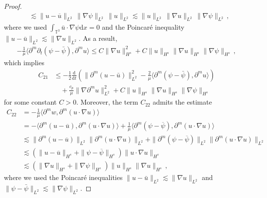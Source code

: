 \documentclass[reqno,11pt]{amsart}
\numberwithin{equation}{section}
\def\p{\partial}
\def\d{\mathrm{d}}
\begin{document}
\begin{proof}
\begin{equation*}
\begin{aligned}
& \lesssim \| u - \overline{u} \|_{L^2} \, \| \nabla \psi \|_{L^2} \, \| u \|_{L^2} \lesssim \| u \|_{L^2} \, \| \nabla u \|_{L^2} \, \| \nabla \psi \|_{L^2} \,,
\end{aligned}
\end{equation*}
where we used $ \int_{\mathbb{T}^3} \bar{u} \cdot \nabla \psi \d x=0$ and the Poincar\'e inequality $ \| u - \bar{u} \|_{L^2} \lesssim \| \nabla u \|_{L^2}$. As a result,
\begin{equation*}
\begin{aligned}
-\frac{1}{\mu}\langle \p^m\p_t(\psi-\bar{\psi}),\p^m u\rangle\leq C\|\nabla u\|^2_{H^s}+C\|u\|_{H^s}\|\nabla u\|_{H^s}\|\nabla \psi\|_{H^s} \,,
\end{aligned}
\end{equation*}
which implies
\begin{equation}\label{gpsi-eq9}
\begin{aligned}
C_{21} & \leq - \frac{1}{2} \frac{\d}{\d t} \left( \| \partial^m (u-\bar{u})\|_{L^2}^2 - \frac{2}{\mu} \langle \partial^m(\psi - \bar{\psi}), \partial^m u \rangle \right) \\
& \quad + \frac{c_p}{\mu}\|\nabla \partial^m u\|^2_{L^2} + C \| u \|_{H^s} \| \nabla u \|_{H^s} \| \nabla \psi \|_{H^s} 
\end{aligned}
\end{equation}
for some constant $C > 0 $. Moreover, the term $C_{22}$ admits the estimate
\begin{equation}\label{gpsi-eq10}
\begin{aligned}
C_{22}&= -\frac{1}{\mu} \langle \partial^m w, \partial^m (u\cdot \nabla u) \rangle \\&= -\langle \partial^m (u-\overline{u}), \partial^m (u\cdot \nabla u) \rangle + \frac{1}{\mu} \langle \partial^m (\psi - \overline{\psi}), \partial^m (u\cdot \nabla u) \rangle\\&
\lesssim \|\partial^m (u-\overline{u})\|_{L^2} \|\partial^m (u\cdot \nabla u)\|_{L^2} + \|\partial^m (\psi - \overline{\psi})\|_{L^2} \|\partial^m (u\cdot \nabla u)\|_{L^2}\\&
\lesssim (\|u-\overline{u}\|_{H^s} + \|\psi - \overline{\psi}\|_{H^s}) \|u\cdot \nabla u\|_{H^s}\\&
\lesssim (\|\nabla u\|_{H^s} + \|\nabla \psi\|_{H^s}) \|u\|_{H^s} \|\nabla u\|_{H^s} \,,
\end{aligned}
\end{equation}
where we used the Poincar\'e inequalities $\|u-\bar{u}\|_{L^2}\lesssim\|\nabla u\|_{L^2}$ and $\|\psi-\bar{\psi}\|_{L^2}\lesssim\|\nabla \psi\|_{L^2}$.


\end{proof}
\end{document}
